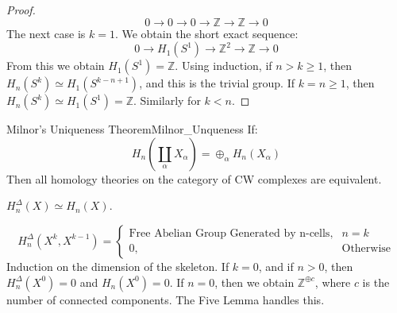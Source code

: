 \begin{proof}
\begin{equation}
            0\longrightarrow0\longrightarrow0\longrightarrow
            \mathbb{Z}\longrightarrow\mathbb{Z}\longrightarrow0
        \end{equation}
        The next case is $k=1$. We obtain the short exact sequence:
        \begin{equation}
            0\longrightarrow{H}_{1}(S^{1})\longrightarrow
            \mathbb{Z}^{2}\longrightarrow\mathbb{Z}\longrightarrow0
        \end{equation}
        From this we obtain $H_{1}(S^{1})=\mathbb{Z}$. Using induction,
        if $n>k\geq{1}$, then $H_{n}(S^{k})\simeq{H}_{1}(S^{k-n+1})$,
        and this is the trivial group. If $k=n\geq{1}$, then
        $H_{n}(S^{k})\simeq{H}_{1}(S^{1})=\mathbb{Z}$. Similarly for
        $k<n$.
    \end{proof}
    \begin{ltheorem}{Milnor's Uniqueness Theorem}{Milnor_Unqueness}
        If:
        \begin{equation}
            H_{n}(\coprod_{\alpha}X_{\alpha})
            =\oplus_{\alpha}H_{n}(X_{\alpha})
        \end{equation}
        Then all homology theories on the category of CW complexes
        are equivalent.
    \end{ltheorem}
    \begin{theorem}
        $H_{n}^{\Delta}(X)\simeq{H}_{n}(X)$.
    \end{theorem}
    \begin{equation}
        H_{n}^{\Delta}(X^{k},X^{k-1})=
        \begin{cases}
            \textrm{Free Abelian Group Generated by n-cells},&n=k\\
            0,&\textrm{Otherwise}
        \end{cases}
    \end{equation}
    Induction on the dimension of the skeleton. If $k=0$, and if
    $n>0$, then $H_{n}^{\Delta}(X^{0})=0$ and $H_{n}(X^{0})=0$. If
    $n=0$, then we obtain $\mathbb{Z}^{\oplus{c}}$, where $c$ is the
    number of connected components. The Five Lemma handles this.
